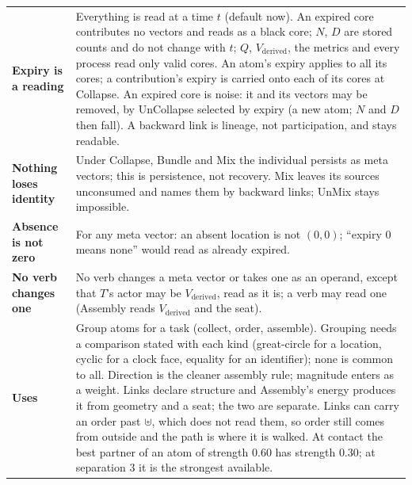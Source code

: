 \documentclass[10.5pt]{article}
\begin{document}
{\begin{longtable}{L{3.0cm}L{13.6cm}}
\textbf{Expiry is a reading} & Everything is read at a time $t$ (default now). An expired core contributes no vectors and reads as a black core; $N$, $D$ are stored counts and do not change with $t$; $Q$, $V_{\text{derived}}$, the metrics and every process read only valid cores. An atom's expiry applies to all its cores; a contribution's expiry is carried onto each of its cores at Collapse. An expired core is noise: it and its vectors may be removed, by UnCollapse selected by expiry (a new atom; $N$ and $D$ then fall). A backward link is lineage, not participation, and stays readable. \\
\textbf{Nothing loses identity} & Under Collapse, Bundle and Mix the individual persists as meta vectors; this is persistence, not recovery. Mix leaves its sources unconsumed and names them by backward links; UnMix stays impossible. \\
\textbf{Absence is not zero} & For any meta vector: an absent location is not $(0,0)$; “expiry $0$ means none” would read as already expired. \\
\textbf{No verb changes one} & No verb changes a meta vector or takes one as an operand, except that $T$'s actor may be $V_{\text{derived}}$, read as it is; a verb may read one (Assembly reads $V_{\text{derived}}$ and the seat). \\
\textbf{Uses} & Group atoms for a task (collect, order, assemble). Grouping needs a comparison stated with each kind (great-circle for a location, cyclic for a clock face, equality for an identifier); none is common to all. Direction is the cleaner assembly rule; magnitude enters as a weight. Links declare structure and Assembly's energy produces it from geometry and a seat; the two are separate. Links can carry an order past $\uplus$, which does not read them, so order still comes from outside and the path is where it is walked. At contact the best partner of an atom of strength $0.60$ has strength $0.30$; at separation $3$ it is the strongest available. \\
\bottomrule
\end{longtable}}
\end{document}
